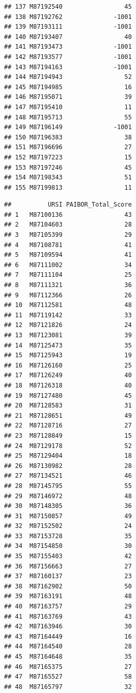 \documentclass[
  man]{apa6}
\begin{document}
\begin{verbatim}
## 137 M87192540                 45
## 138 M87192762              -1001
## 139 M87193111              -1001
## 140 M87193407                 40
## 141 M87193473              -1001
## 142 M87193577              -1001
## 143 M87194163              -1001
## 144 M87194943                 52
## 145 M87194985                 16
## 146 M87195071                 39
## 147 M87195410                 11
## 148 M87195713                 55
## 149 M87196149              -1001
## 150 M87196383                 38
## 151 M87196696                 27
## 152 M87197223                 15
## 153 M87197246                 45
## 154 M87198343                 51
## 155 M87199813                 11
\end{verbatim}

\begin{verbatim}
##          URSI PAIBOR_Total_Score
## 1   M87100136                 43
## 2   M87104603                 28
## 3   M87105399                 29
## 4   M87108781                 41
## 5   M87109594                 41
## 6   M87111002                 34
## 7   M87111104                 25
## 8   M87111321                 36
## 9   M87112366                 26
## 10  M87112581                 48
## 11  M87119142                 33
## 12  M87121826                 24
## 13  M87123081                 39
## 14  M87125473                 35
## 15  M87125943                 19
## 16  M87126160                 25
## 17  M87126249                 40
## 18  M87126318                 40
## 19  M87127480                 45
## 20  M87128583                 31
## 21  M87128651                 49
## 22  M87128716                 27
## 23  M87128849                 15
## 24  M87129178                 52
## 25  M87129404                 18
## 26  M87130982                 28
## 27  M87134521                 46
## 28  M87145795                 55
## 29  M87146972                 48
## 30  M87148305                 36
## 31  M87150857                 49
## 32  M87152502                 24
## 33  M87153728                 35
## 34  M87154850                 30
## 35  M87155403                 42
## 36  M87156663                 27
## 37  M87160137                 23
## 38  M87162902                 50
## 39  M87163191                 48
## 40  M87163757                 29
## 41  M87163769                 43
## 42  M87163946                 30
## 43  M87164449                 16
## 44  M87164540                 28
## 45  M87164648                 35
## 46  M87165375                 27
## 47  M87165527                 58
## 48  M87165797                 32

\end{verbatim}
\end{document}
